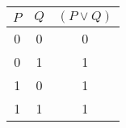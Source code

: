 \begin{tabular}{|c|c||c|}
\hline
$ P $ & $ Q $ & $ (P \vee Q) $ \\
\hline
0 & 0 & 0 \\
0 & 1 & 1 \\
1 & 0 & 1 \\
1 & 1 & 1 \\
\hline
\end{tabular}
